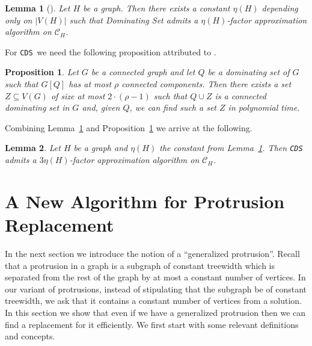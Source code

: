 \documentclass[11pt]{article}
\newtheorem{proposition}{Proposition}
\newtheorem{lemma}{Lemma}
\newcommand{\tCDS}{{\texttt{\sc CDS}}}
\begin{document}
\begin{lemma}[\cite{Dvorak13}]
\label{lemma:approximation}
Let $H$ be a   graph. Then there exists a constant $\eta(H)$ depending only on $|V(H)|$ such that 
{\sc Dominating Set}  admits  a $\eta(H)$-factor approximation algorithm on  $\mathcal{C}_H$. 
\end{lemma}


For \tCDS \,  we  need the following proposition attributed to \cite{Duchet82}.
\begin{proposition}
\label{lem:bb}
Let $G$ be a connected graph and let $Q$ be a dominating set of $G$ such that $G[Q]$ has at most $\rho$ connected components. Then 
there exists a set $Z\subseteq V(G)$ of size  at most $2\cdot (\rho-1)$  
 such that $Q\cup Z$ is a connected dominating set in $G$ and, given $Q$, we can find such a set $Z$ in polynomial time. 
\end{proposition}

Combining Lemma~\ref{lemma:approximation} and Proposition~\ref{lem:bb} we arrive at the following. 
\begin{lemma}
\label{lemma:approximationcds}
Let $H$ be a   graph and $\eta(H)$ the constant from  Lemma~\ref{lemma:approximation}. Then
\tCDS \,  admits  a $3\eta(H)$-factor approximation algorithm on  $\mathcal{C}_H$. 
\end{lemma}





\section{A New Algorithm for Protrusion Replacement}
\label{sec:gens:protrs}


In the next section we introduce the notion of a ``generalized protrusion''.  Recall that a protrusion in a graph  is a subgraph of constant treewidth which is separated from the rest of the graph by at most a constant number of vertices. In our variant of protrusions, instead of stipulating that the subgraph be of constant treewidth, we ask that it contains a  constant number of vertices from a solution. In this section we show that even if we have a generalized protrusion then we can find a replacement for it efficiently.  
We first start with some relevant definitions and concepts. 
\end{document}
